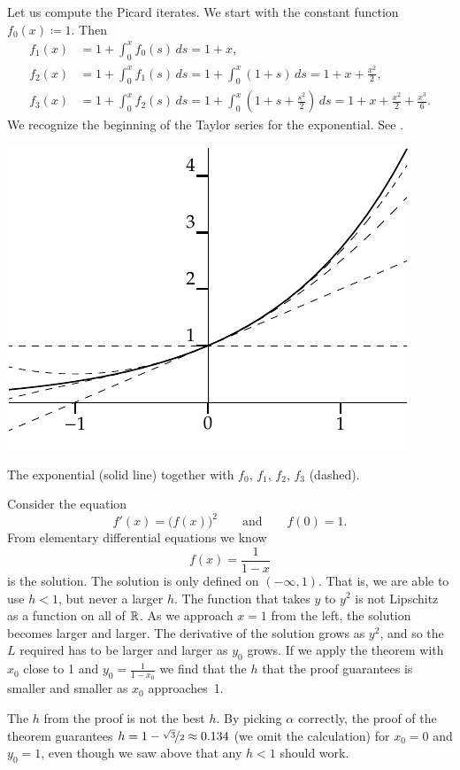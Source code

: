 \begin{example}
Let us compute the Picard iterates.
We start with the constant function $f_0(x) \coloneqq 1$.  Then
\begin{align*}
f_1(x) & = 1 + \int_0^x f_0(s)\,ds =
1+x, \\
f_2(x) & = 1 + \int_0^x f_1(s)\,ds =
1 + \int_0^x (1+s)\,ds = 1 + x + \frac{x^2}{2}, \\
f_3(x) & = 1 + \int_0^x f_2(s)\,ds =
1 + \int_0^x \left(1+ s + \frac{s^2}{2} \right)\,ds =
1 + x + \frac{x^2}{2} + \frac{x^3}{6} .
\end{align*}
We recognize the beginning of the Taylor series for the exponential.
See .
\begin{myfigureht}
\includegraphics{figures/exppicardfig}
\caption{The exponential (solid line) together with $f_0$, $f_1$, $f_2$,
$f_3$ (dashed).\label{fig:exppicard}}
\end{myfigureht}
\end{example}

\begin{example}
Consider the equation
\begin{equation*}
f'(x) = {\bigl(f(x)\bigr)}^2 \qquad \text{and} \qquad f(0)=1.
\end{equation*}
From elementary differential equations we know 
\begin{equation*}
f(x) = \frac{1}{1-x}
\end{equation*}
is the solution.
The solution is only defined on $(-\infty,1)$.  That is,
we are able to use $h < 1$, but never a larger $h$.
The function that takes $y$ to $y^2$ is
not Lipschitz as a function on all of ${\mathbb{R}}$.
As we approach $x=1$ from the left, the solution becomes larger
and larger.  The derivative of the solution grows as $y^2$, and so
the $L$ required has to be larger and larger as $y_0$ grows.
If we apply the
theorem with $x_0$ close to 1 and $y_0 = \frac{1}{1-x_0}$ we find
that the $h$ that the proof guarantees is smaller and smaller as $x_0$
approaches~1.

The $h$ from the proof is not the best $h$.
By picking $\alpha$ correctly, the proof of the theorem guarantees
$h=1-\nicefrac{\sqrt{3}}{2} \approx 0.134$ (we omit the
calculation) for $x_0=0$ and $y_0=1$, even though
we saw above that any $h < 1$ should work.
\end{example}

